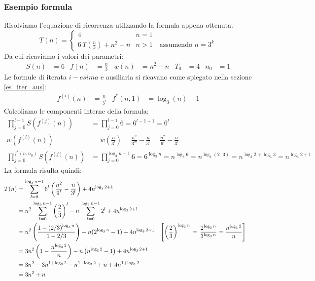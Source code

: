 \subsubsection{Esempio formula}
Risolviamo l'equazione di ricorrenza utilzzando la formula appena ottenuta.
\[
    T(n) = 
    \begin{cases} 
        4      &  n = 1 \\
        6 \, T\left(\frac{n}{3}\right) + n^2-n & n > 1 \quad \text{assumendo } n=3^k
    \end{cases}
\]
Da cui ricaviamo i valori dei parametri:
\begin{align*}
    S(n)&=6 & f(n)&=\frac{n}{3} & w(n)&=n^2-n & T_0&=4 & n_0&=1
\end{align*}
Le formule di iterata $i-esima$ e ausiliaria si ricavano come spiegato nella sezione \ref{es_iter_aus}:
\begin{align*}
    f^{(i)}(n) &= \frac{n}{3^i} & f^*(n, 1) &= \log_3 \left( n \right) - 1
\end{align*}
Calcoliamo le componenti interne della formula:
\begin{align*}
    \prod_{j=0}^{l-1} S \left( f^{(j)}(n) \right) 
    &= \prod_{j=0}^{l-1} 6 = 6^{l-1+1} = 6^l \\
    w\left(f^{(l)}(n) \right) 
    &=  w \left( \frac{n}{3^l} \right) 
    = \frac{n^2}{3^{2l}} - \frac{n}{3^l} = \frac{n^2}{9^l}-\frac{n}{3^l} \\
    \prod_{j=0}^{f^*(n,n_0)} S \left( f^{(j)}(n) \right) 
    &= \prod_{j=0}^{\log_3 n-1} 6 = 6^{\log_3 n} =
    n^{\log_3 6} = n^{\log_3 (2\cdot3)} = n^{\log_3 2 + \log_3 3} = n^{\log_3 2 + 1}
\end{align*}
La formula risulta quindi:
\begin{align*}
    T(n) & = \sum_{l=0}^{\log_3 n-1} 6^l \left( \frac{n^2}{9^l}-\frac{n}{3^l} \right) + 4 n^{\log_3 2 + 1} \\
    & = n^2\,\sum_{l=0}^{\log_3 n-1} \left( \frac{2}{3} \right)^l - n\,\sum_{l=0}^{\log_3 n-1} 2^l+ 4 n^{\log_3 2+1} \\
    & = n^2 \left( \frac{1- \left( 2/3 \right)^{\log_3 n} }{1 - 2/3 } \right) - n(2^{\log_3 n} -1) + 4 n^{\log_3 2+1} 
    &
    \left[
    \left( \frac{2}{3} \right)^{\log_3 n}
    \right. %
    &=      %
    \left.  %
    \frac{2^{\log_3 n}}{3^{\log_3 n}} = \frac{n^{\log_3 2}}{n}
    \vphantom{\left( \frac{2}{3} \right)^{\log_3 n}}
    \right] %
    \\
    & = 3n^2 \left( 1- \frac{n^{\log_3 2}}{n} \right) - n \left( n^{\log_3 2}-1 \right) + 4 n^{\log_3 2+1} \\
    & = 3n^2 -3n^{1+\log_3 2} - n^{1+\log_3 2} + n + 4 n^{1+\log_3 2} \\
    & = 3n^2+n
\end{align*}
